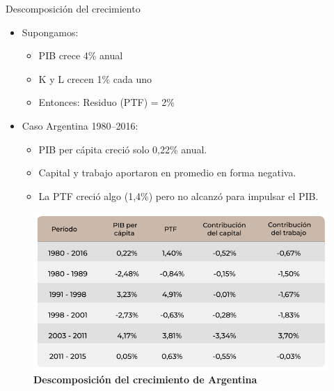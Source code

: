 \documentclass{beamer}
\begin{document}
\begin{frame}{Descomposición del crecimiento}
    \scriptsize
    \begin{itemize}
        \scriptsize
        \item Supongamos:
        \begin{itemize}
            \scriptsize
            \item PIB crece 4\% anual
            \item K y L crecen 1\% cada uno
            \item Entonces: Residuo (PTF) = 2\%
        \end{itemize}
        \item Caso Argentina 1980--2016:
        \begin{itemize}
            \scriptsize
            \item PIB per cápita creció solo 0{,}22\% anual.
            \item Capital y trabajo aportaron en promedio en forma negativa.
            \item La PTF creció algo (1{,}4\%) pero no alcanzó para impulsar el PIB.
        \end{itemize}
    \end{itemize}
    \begin{figure} [H]   
        \includegraphics[scale=0.45]{../Figures/C30.8.png}
        \caption{\tiny \textbf{Descomposición del crecimiento de Argentina}}
    \end{figure}
\end{frame}
\end{document}
